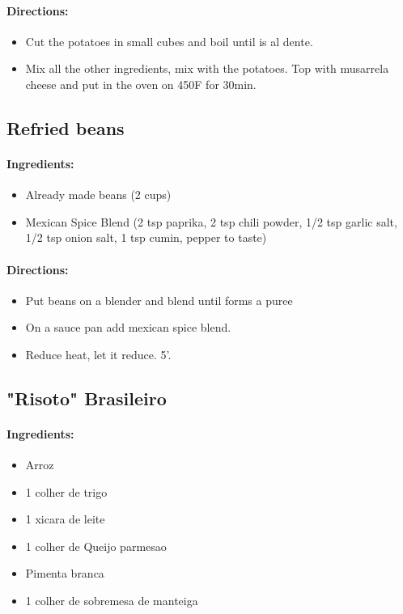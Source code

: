 \documentclass{article}
\begin{document}
\paragraph{Directions:}
\begin{itemize}
	\item Cut the potatoes in small cubes and boil until is al dente.
	\item Mix all the other ingredients, mix with the potatoes. Top with musarrela cheese and put in the oven on 450F for 30min.
\end{itemize}

\subsection{Refried beans}

\paragraph{Ingredients:}

\begin{itemize}
	\item Already made beans (2 cups)
	\item Mexican Spice Blend (2 tsp paprika, 2 tsp chili powder, 1/2 tsp garlic salt, 1/2 tsp onion salt, 1 tsp cumin, pepper to taste)
\end{itemize}

\paragraph{Directions:}
\begin{itemize}
	\item Put beans on a blender and blend until forms a puree
	\item On a sauce pan add mexican spice blend.
	\item Reduce heat, let it reduce. 5'.
\end{itemize} 

\subsection{"Risoto" Brasileiro}

\paragraph{Ingredients:}

\begin{itemize}
	\item Arroz
	\item 1 colher de trigo
	\item 1 xicara de leite
	\item 1 colher de Queijo parmesao
	\item Pimenta branca
	\item 1 colher de sobremesa de manteiga
\end{itemize}
\end{document}
